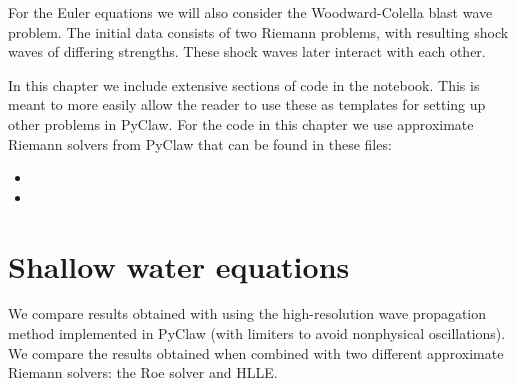 \documentclass{SIAMbook2016}
\providecommand{\tightlist}{%
      \setlength{\itemsep}{0pt}\setlength{\parskip}{0pt}}
\begin{document}
For the Euler equations we will also consider the Woodward-Colella blast
wave problem. The initial data consists of two Riemann problems, with
resulting shock waves of differing strengths. These shock waves later
interact with each other.

In this chapter we include extensive sections of code in the notebook.
This is meant to more easily allow the reader to use these as templates
for setting up other problems in PyClaw. For the code in this chapter we
use approximate Riemann solvers from PyClaw that can be found in these
files:

\begin{itemize}
\tightlist
\item
\item
\end{itemize}

\hypertarget{shallow-water-equations}{%
\section{Shallow water equations}\label{shallow-water-equations}}

We compare results obtained with using the high-resolution wave
propagation method implemented in PyClaw (with limiters to avoid
nonphysical oscillations). We compare the results obtained when combined
with two different approximate Riemann solvers: the Roe solver and HLLE.
\end{document}
